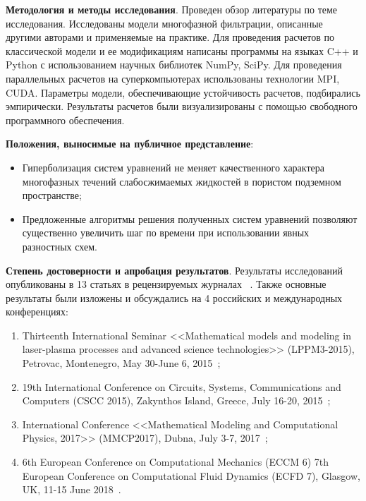 \textbf{Методология и методы исследования}. Проведен обзор литературы по теме исследования. Исследованы модели многофазной фильтрации, описанные другими авторами и применяемые на практике.
Для проведения расчетов по классической модели и ее модификациям написаны программы на языках C++ и Python с использованием научных библиотек NumPy, SciPy. Для проведения параллельных расчетов на суперкомпьютерах использованы технологии MPI, CUDA.
Параметры модели, обеспечивающие устойчивость расчетов, подбирались эмпирически.
Результаты расчетов были визуализированы с помощью свободного программного обеспечения.

\textbf{Положения, выносимые на публичное представление}:
\begin{itemize}
 \item Гиперболизация систем уравнений не меняет качественного характера многофазных течений слабосжимаемых жидкостей в пористом подземном
пространстве;
 \item Предложенные алгоритмы решения полученных систем уравнений позволяют существенно увеличить шаг по времени при использовании явных разностных схем.
\end{itemize}

\textbf{Степень достоверности и апробация результатов}. Результаты исследований опубликованы в 13 статьях в рецензируемых журналах
~\citeauthor{matmod2014, matmod2015, preprint12016, preprint22016, preprint12018, preprint22018, simul2014, modelling2016, problems2018, proc13th, proc19th, proc2017, proc2018}. Также основные результаты были изложены и обсуждались на 4 российских и международных конференциях:
\begin{enumerate}
 \item Thirteenth International Seminar <<Mathematical models and modeling in laser-plasma processes and advanced science technologies>> (LPPM3-2015), Petrovac, Montenegro, May 30-June 6, 2015~\citeauthor{proc13th};
 \item 19th International Conference on Circuits, Systems, Communications and Computers (CSCC 2015), Zakynthos Island, Greece, July 16-20, 2015~\citeauthor{proc19th};
 \item International Conference <<Mathematical Modeling and Computational Physics, 2017>> (MMCP2017), Dubna, July 3-7, 2017~\citeauthor{proc2017};
 \item 6th European Conference on Computational Mechanics (ECCM 6) 7th European Conference on Computational Fluid Dynamics (ECFD 7), Glasgow, UK, 11-15 June 2018~\citeauthor{proc2018}.
\end{enumerate}
 
